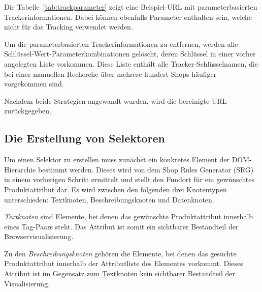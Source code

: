 Die Tabelle~\ref{tab:trackparameter} zeigt eine Beispiel-URL mit parameterbasierten Trackerinformationen.
Dabei können ebenfalls Parameter enthalten sein, welche nicht für das Tracking verwendet werden.

Um die parameterbasierten Trackerinformationen zu entfernen, werden alle Schlüssel-Wert-Parameterkombinationen
gelöscht, deren Schlüssel in einer vorher angelegten Liste vorkommen.
Diese Liste enthält alle Tracker-Schlüsselnamen, die bei einer manuellen Recherche über mehrere hundert Shops
häufiger vorgekommen sind.

Nachdem beide Strategien angewandt wurden, wird die bereinigte URL zurückgegeben.

\subsection{Die Erstellung von Selektoren}
\label{subsec:erstellen-von-selektoren}

Um einen Selektor zu erstellen muss zunächst ein konkretes Element der DOM-Hierarchie bestimmt werden.
Dieses wird von dem Shop Rules Generator (SRG) in einem vorherigen Schritt ermittelt und stellt den Fundort für ein
gewünschtes Produktattribut dar.
Es wird zwischen den folgenden drei Knotentypen unterschieden: Textknoten, Beschreibungsknoten und Datenknoten.

\textit{Textknoten} sind Elemente, bei denen das gewünschte Produktattribut innerhalb eines Tag-Paars steht.
Das Attribut ist somit ein sichtbarer Bestandteil der Browservisualisierung.

Zu den \textit{Beschreibungsknoten} gehören die Elemente, bei denen das gesuchte Produktattribut innerhalb der
Attributliste des Elementes vorkommt.
Dieses Attribut ist im Gegensatz zum Textknoten kein sichtbarer Bestandteil der Visualisierung.

